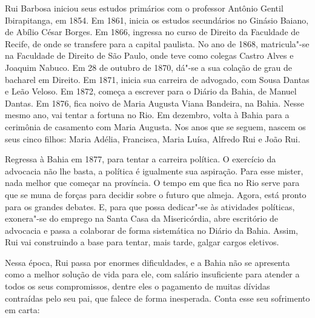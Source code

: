 Rui Barbosa iniciou seus estudos primários com o professor Antônio Gentil
Ibirapitanga, em 1854. Em 1861, inicia os estudos secundários no
Ginásio Baiano, de Abílio César Borges. Em 1866, ingressa no curso de
Direito da Faculdade de Recife, de onde se transfere para a capital
paulista. No ano de 1868, matricula"-se na Faculdade de Direito de São
Paulo, onde teve como colegas Castro Alves e Joaquim Nabuco. Em 28 de
outubro de 1870, dá"-se a sua colação de grau de bacharel em Direito. Em
1871, inicia sua carreira de advogado, com Sousa Dantas e Leão Veloso.
Em 1872, começa a escrever para o Diário da Bahia, de Manuel Dantas. Em
1876, fica noivo de Maria Augusta Viana Bandeira, na Bahia. Nesse mesmo
ano, vai tentar a fortuna no Rio. Em dezembro, volta à Bahia para a 
cerimônia de casamento com Maria Augusta. Nos anos que se seguem, 
nascem os seus cinco filhos: Maria Adélia, Francisca, Maria Luísa, Alfredo Rui e João Rui.

Regressa à Bahia em 1877, para tentar a carreira política. O exercício
da advocacia não lhe basta, a política é igualmente sua aspiração. Para
esse mister, nada melhor que começar na província. 
O tempo em que fica no Rio serve para que se muna de forças
para decidir sobre o futuro que almeja. Agora, está pronto para os
grandes debates. E, para que possa dedicar"-se às atividades políticas,
exonera"-se do emprego na Santa Casa da Misericórdia, abre escritório de
advocacia e passa a colaborar de forma sistemática no Diário da Bahia.
Assim, Rui vai construindo a base para tentar, mais tarde, galgar
cargos eletivos.

Nessa época, Rui passa por enormes dificuldades, e a Bahia não se
apresenta como a melhor solução de vida para ele, com salário
insuficiente para atender a todos os seus compromissos, dentre eles o
pagamento de muitas dívidas contraídas pelo seu pai, que falece de
forma inesperada. Conta esse seu sofrimento em carta: 

